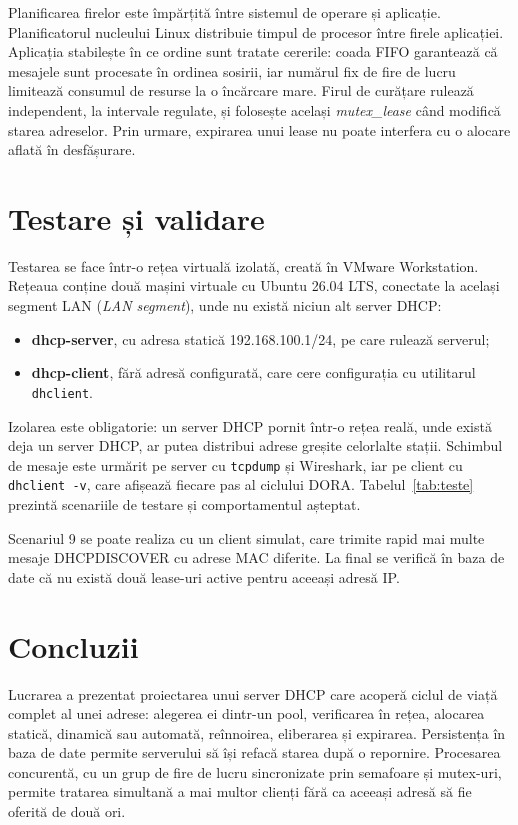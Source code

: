 \documentclass[conference]{IEEEtran}
\begin{document}
Planificarea firelor este împărțită între sistemul de operare și aplicație. Planificatorul nucleului Linux distribuie timpul de procesor între firele aplicației. Aplicația stabilește în ce ordine sunt tratate cererile: coada FIFO garantează că mesajele sunt procesate în ordinea sosirii, iar numărul fix de fire de lucru limitează consumul de resurse la o încărcare mare. Firul de curățare rulează independent, la intervale regulate, și folosește același \textit{mutex\_lease} când modifică starea adreselor. Prin urmare, expirarea unui lease nu poate interfera cu o alocare aflată în desfășurare.

\section{Testare și validare}\label{sec:testare}
Testarea se face într-o rețea virtuală izolată, creată în VMware Workstation. Rețeaua conține două mașini virtuale cu Ubuntu 26.04 LTS, conectate la același segment LAN (\textit{LAN segment}), unde nu există niciun alt server DHCP:
\begin{itemize}
\item \textbf{dhcp-server}, cu adresa statică 192.168.100.1/24, pe care rulează serverul;
\item \textbf{dhcp-client}, fără adresă configurată, care cere configurația cu utilitarul \texttt{dhclient}.
\end{itemize}

Izolarea este obligatorie: un server DHCP pornit într-o rețea reală, unde există deja un server DHCP, ar putea distribui adrese greșite celorlalte stații. Schimbul de mesaje este urmărit pe server cu \texttt{tcpdump} și Wireshark, iar pe client cu \texttt{dhclient -v}, care afișează fiecare pas al ciclului DORA. Tabelul~\ref{tab:teste} prezintă scenariile de testare și comportamentul așteptat.


Scenariul 9 se poate realiza cu un client simulat, care trimite rapid mai multe mesaje DHCPDISCOVER cu adrese MAC diferite. La final se verifică în baza de date că nu există două lease-uri active pentru aceeași adresă IP.

\section{Concluzii}\label{sec:concluzii}
Lucrarea a prezentat proiectarea unui server DHCP care acoperă ciclul de viață complet al unei adrese: alegerea ei dintr-un pool, verificarea în rețea, alocarea statică, dinamică sau automată, reînnoirea, eliberarea și expirarea. Persistența în baza de date permite serverului să își refacă starea după o repornire. Procesarea concurentă, cu un grup de fire de lucru sincronizate prin semafoare și mutex-uri, permite tratarea simultană a mai multor clienți fără ca aceeași adresă să fie oferită de două ori.
\end{document}
